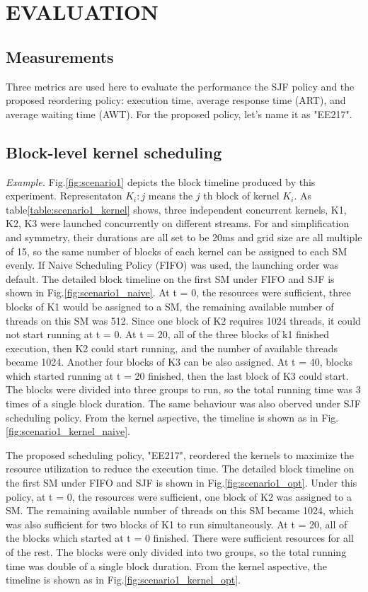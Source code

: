 \documentclass[12pt,journal,compsoc]{IEEEtran}
\begin{document}
\section{EVALUATION}
\subsection{Measurements}
Three metrics are used here to evaluate the performance the SJF policy and the proposed reordering policy: execution time, average response time (ART), and average waiting time (AWT). For the proposed policy, let's name it as "EE217".

\subsection{Block-level kernel scheduling}
\textit{Example.}
Fig.\ref{fig:scenario1} depicts the block timeline produced by this experiment. Representaton $K_i:j$ means the $j$ th block of kernel $K_i$. As table\ref{table:scenario1_kernel} shows, three independent concurrent kernels, K1, K2, K3 were launched concurrently on different streams. For and simplification and symmetry, their durations are all set to be 20ms and grid size are all multiple of 15, so the same number of blocks of each kernel can be assigned to each SM evenly. If Naive Scheduling Policy (FIFO) was used, the launching order was default. The detailed block timeline on the first SM under FIFO and SJF is shown in Fig.\ref{fig:scenario1_naive}. At t = 0, the resources were sufficient, three blocks of K1 would be assigned to a SM, the remaining available number of threads on this SM was 512. Since one block of K2 requires 1024 threads, it could not start running at t = 0. At t = 20, all of the three blocks of k1 finished execution, then K2 could start running, and the number of available threads became 1024. Another four blocks of K3 can be also assigned. At t = 40, blocks which started running at t = 20 finished, then the last block of K3 could start. The blocks were divided into three groups to run, so the total running time was 3 times of a single block duration. The same behaviour was also oberved under SJF scheduling policy. From the kernel aspective, the timeline is shown as in Fig.\ref{fig:scenario1_kernel_naive}.

The proposed scheduling policy, "EE217", reordered the kernels to maximize the resource utilization to reduce the execution time. The detailed block timeline on the first SM under FIFO and SJF is shown in Fig.\ref{fig:scenario1_opt}. Under this policy, at t = 0, the resources were sufficient, one block of K2 was assigned to a SM. The remaining available number of threads on this SM became 1024, which was also sufficient for two blocks of K1 to run simultaneously. At t = 20, all of the blocks which started at t = 0 finished. There were sufficient resources for all of the rest. The blocks were only divided into two groups, so the total running time was double of a single block duration. From the kernel aspective, the timeline is shown as in Fig.\ref{fig:scenario1_kernel_opt}.
\end{document}
